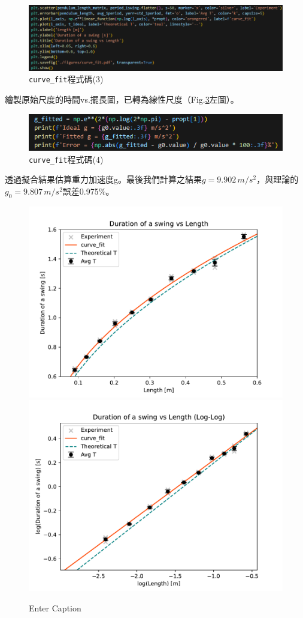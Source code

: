 \documentclass[12pt,a4paper]{article}
\begin{document}
\begin{CJK}{UTF8}{bkai}
\begin{figure}[h]
    \centering
    \includegraphics[width=1\linewidth]{curve3.png}
    \caption{\texttt{curve\_fit}程式碼(3)}
    \label{fig:curve_fit3}
\end{figure}
\indent 繪製原始尺度的時間vs.擺長圖，已轉為線性尺度（Fig.\ref{fig:curve_fit}左圖）。

\clearpage

\begin{figure}[h]
    \centering
    \includegraphics[width=1\linewidth]{curve4.png}
    \caption{\texttt{curve\_fit}程式碼(4)}
    \label{fig:curve_fit4}
\end{figure}
\indent 透過擬合結果估算重力加速度g。最後我們計算之結果$g=9.902\,m/s^2$，與理論的$g_0=9.807\,m/s^2$誤差0.975\%。

\begin{figure}[h]
    \centering
    \includegraphics[width=0.45\linewidth]{curve_fit.pdf}
     \includegraphics[width=0.45\linewidth]{curve_fit_log.pdf}
    \caption{Enter Caption}
    \label{fig:curve_fit}
\end{figure}


\end{CJK}
\end{document}
